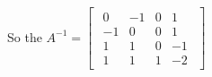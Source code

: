 \singlespacing

So the $A^{-1} = \begin{bmatrix}
        \begin{array}{cccc}
            0  & -1 & 0 & 1  \\
            -1 & 0  & 0 & 1  \\
            1  & 1  & 0 & -1 \\
            1  & 1  & 1 & -2
        \end{array}
    \end{bmatrix}$